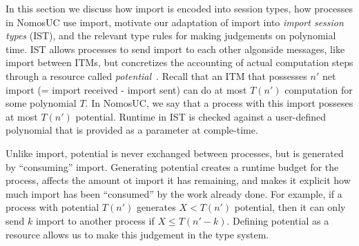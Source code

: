 In this section we discuss how import is encoded into session types, how processes in NomosUC use import, motivate our adaptation of import into \emph{import session types} (IST), and the relevant type rules for making judgements on polynomial time.
IST allows processes to send import to each other algonside messages, like import between ITMs, but concretizes the accounting of actual computation steps through a resource called \emph{potential}~\cite{das2018work,dasnomos}.
Recall that an ITM that possesses $n'$ net import (= import received - import sent) can do at most $T(n')$ computation for some polynomial $T$.
In NomosUC, we say that a process with this import posseses at most $T(n')$ potential.
Runtime in IST is checked against a user-defined polynomial that is provided as a parameter at comple-time.

Unlike import, potential is never exchanged between processes, but is generated by ``consuming'' import.
Generating potential creates a runtime budget for the process, affects the amount ot import it has remaining, and makes it explicit how much import has been ``consumed'' by the work already done.
For example, if a process with potential $T(n')$ generates $X < T(n')$ potential, then it can only send $k$ import to another process if $X \leq T(n'-k)$.
Defining potential as a resource allows us to make this judgement in the type system. 


